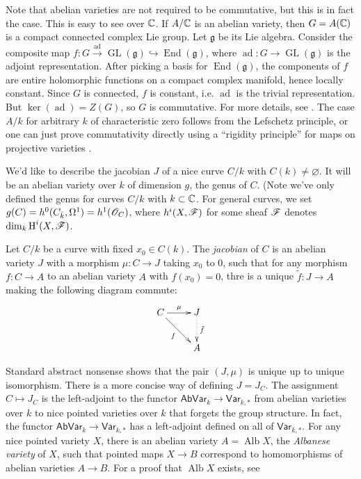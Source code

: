 \documentclass{article}
\begin{document}
Note that abelian varieties are not required to be commutative, but this is in 
fact the case. This is easy to see over $\mathbb{C}$. If $A/\mathbb{C}$ is an 
abelian variety, then $G=A(\mathbb{C})$ is a compact connected complex Lie 
group. Let $\mathfrak{g}$ be its Lie algebra. Consider the composite map 
$f:G\xrightarrow{\text{ad}}\operatorname{GL}(\mathfrak{g}) \hookrightarrow 
\operatorname{End}(\mathfrak{g})$, where 
$\operatorname{ad}:G\to\operatorname{GL}(\mathfrak{g})$ is the adjoint 
representation. After picking a basis for $\operatorname{End}(\mathfrak{g})$, 
the components of $f$ are entire holomorphic functions on a compact complex 
manifold, hence locally constant. Since $G$ is connected, $f$ is constant, i.e. 
$\operatorname{ad}$ is the trivial representation. But 
$\ker(\operatorname{ad}) = Z(G)$, so $G$ is commutative. For more details, see 
\cite[I.1]{mu08}. The case $A/k$ for arbitrary $k$ of characteristic zero 
follows from the Lefschetz principle, or one can just prove commutativity 
directly using a ``rigidity principle'' for maps on projective varieties
\cite[I.1.4]{mi}. 

We'd like to describe the jacobian $J$ of a nice curve $C/k$ with 
$C(k)\ne\varnothing$. It will be an abelian variety over $k$ of dimension 
$g$, the genus of $C$. (Note we've only defined the genus for curves 
$C/k$ with $k\subset\mathbb{C}$. For general curves, we set  
$g(C)=h^0(C_{\bar k},\Omega^1) = h^1(\mathscr{O}_C)$, where 
$h^i(X,\mathscr{F})$ for some sheaf $\mathscr{F}$ denotes 
$\dim_k\operatorname{H}^i(X,\mathscr{F})$. 

\begin{definition}[Albanese]
Let $C/k$ be a curve with fixed $x_0\in C(k)$. The \emph{jacobian} of $C$ is 
an abelian variety $J$ with a morphism $\mu:C\to J$ taking $x_0$ to $0$, such 
that for any morphism $f:C\to A$ to an abelian variety $A$ with $f(x_0)=0$, 
thre is a unique $\tilde f:J\to A$ making the following diagram commute:
\[\xymatrix{
  C \ar[r]^-\mu \ar[dr]_-f 
    & J \ar@{.>}[d]^-{\tilde f} \\
  & A
}\]
\end{definition}

Standard abstract nonsense shows that the pair $(J,\mu)$ is unique up to 
unique isomorphism. There is a more concise way of defining $J=J_C$. The 
assignment $C\mapsto J_C$ is the left-adjoint to the functor 
$\mathsf{AbVar}_k\to \mathsf{Var}_{k,*}$ from abelian varieties over $k$ to 
nice pointed varieties over $k$ that forgets the group structure. In fact, the 
functor $\mathsf{AbVar}_k\to\mathsf{Var}_{k,*}$ has a left-adjoint defined 
on all of $\mathsf{Var}_{k,*}$. For any nice pointed variety $X$, there is an 
abelian variety $A=\operatorname{Alb} X$, the \emph{Albanese variety} of $X$, 
such that pointed maps $X\to B$ correspond to homomorphisms of abelian 
varieties $A\to B$. For a proof that $\operatorname{Alb} X$ exists, see 
\cite[A.11]{mo12}
\end{document}
